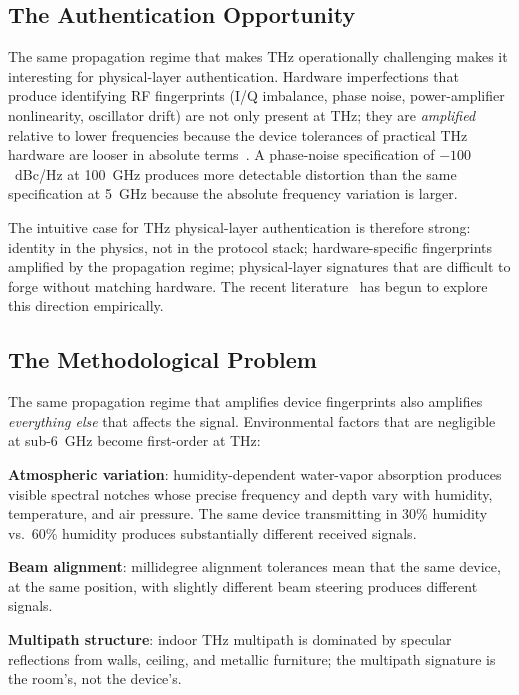 \documentclass[sigconf,nonacm]{acmart}
\begin{document}
\subsection{The Authentication Opportunity}

The same propagation regime that makes THz operationally challenging
makes it interesting for physical-layer authentication. Hardware
imperfections that produce identifying RF fingerprints
(I/Q imbalance, phase noise, power-amplifier nonlinearity, oscillator
drift) are not only present at THz; they are \emph{amplified} relative
to lower frequencies because the device tolerances of practical THz
hardware are looser in absolute terms~\cite{singh2024thzhardware}. A
phase-noise specification of $-100$~dBc/Hz at 100~GHz produces more
detectable distortion than the same specification at 5~GHz because
the absolute frequency variation is larger.

The intuitive case for THz physical-layer authentication is therefore
strong: identity in the physics, not in the protocol stack;
hardware-specific fingerprints amplified by the propagation
regime; physical-layer signatures that are difficult to forge without
matching hardware. The recent
literature~\cite{soltanieh2024thzauth,liu2025thzfingerprint}
has begun to explore this direction empirically.

\subsection{The Methodological Problem}

The same propagation regime that amplifies device fingerprints also
amplifies \emph{everything else} that affects the signal. Environmental
factors that are negligible at sub-6~GHz become first-order at THz:

\textbf{Atmospheric variation}: humidity-dependent water-vapor
absorption produces visible spectral notches whose precise frequency
and depth vary with humidity, temperature, and air pressure. The
same device transmitting in 30\% humidity vs.\ 60\% humidity produces
substantially different received signals.

\textbf{Beam alignment}: millidegree alignment tolerances mean that
the same device, at the same position, with slightly different beam
steering produces different signals.

\textbf{Multipath structure}: indoor THz multipath is dominated by
specular reflections from walls, ceiling, and metallic furniture;
the multipath signature is the room's, not the device's.
\end{document}
